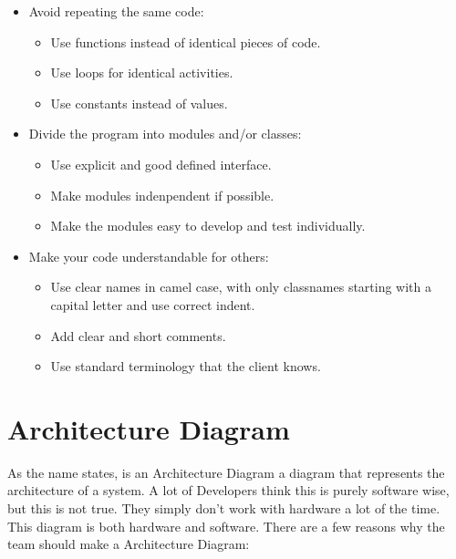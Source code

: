 \documentclass[10pt]{report}
\begin{document}
\begin{itemize}
	\item Avoid repeating the same code:
	\begin{itemize}
		\item Use functions instead of identical pieces of code.
		\item Use loops for identical activities.
		\item Use constants instead of values.
	\end{itemize}
	
	\item Divide the program into modules and/or classes:
	\begin{itemize}
		\item Use explicit and good defined interface.
		\item Make modules indenpendent if possible.
		\item Make the modules easy to develop and test individually.
	\end{itemize}
	
	\item Make your code understandable for others:
	\begin{itemize}
		\item Use clear names in camel case, with only classnames starting with a capital letter and use correct indent.
		\item Add clear and short comments.
		\item Use standard terminology that the client knows.
	\end{itemize}
	
\end{itemize}

\newpage

\section{Architecture Diagram}

As the name states, is an Architecture Diagram a diagram that represents the architecture of a system. A lot of Developers think this is purely software wise, but this is not true. They simply don't work with hardware a lot of the time. This diagram is both hardware and software. There are a few reasons why the team should make a Architecture Diagram:
\end{document}
